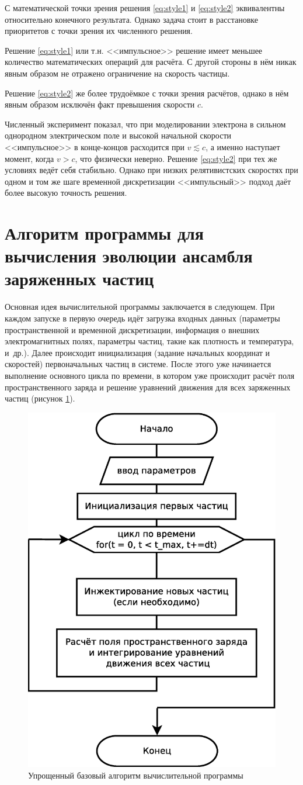 С математической точки зрения решения \eqref{eq:style1} и \eqref{eq:style2} эквивалентны относительно конечного результата. Однако задача стоит в расстановке приоритетов с точки зрения их численного решения. 

Решение \eqref{eq:style1} или т.н. <<импульсное>> решение имеет меньшее количество математических операций для расчёта. С другой стороны в нём никак явным образом не отражено ограничение на скорость частицы.

Решение \eqref{eq:style2} же более трудоёмкое с точки зрения расчётов, однако в нём явным образом исключён факт превышения скорости $c$.

Численный эксперимент показал, что при моделировании электрона в сильном однородном электрическом поле и высокой начальной скорости <<импульсное>> в конце-концов расходится при $v \lesssim c$, а именно наступает момент, когда $v>c$, что физически неверно. Решение \eqref{eq:style2} при тех же условиях ведёт себя стабильно. Однако при низких релятивистских скоростях при одном и том же шаге временной дискретизации <<импульсный>> подход даёт более высокую точность решения.


\section{Алгоритм программы для вычисления эволюции ансамбля заряженных частиц}

Основная идея вычислительной программы заключается в следующем. При каждом запуске в первую очередь идёт загрузка входных данных (параметры пространственной и временной дискретизации, информация о внешних электромагнитных полях, параметры частиц, такие как плотность и температура, и~др.). Далее происходит инициализация (задание начальных координат и скоростей) первоначальных частиц в системе. После этого уже начинается выполнение основного цикла по времени, в котором уже происходит расчёт поля пространственного заряда и решение уравнений движения для всех заряженных частиц (рисунок \ref{fig:Diagram1}). 

\begin{figure}[h!]
\centering
\includegraphics[width=0.5\linewidth]{./fig/ch3/Diagram1}
\caption{Упрощенный базовый алгоритм вычислительной программы}
\label{fig:Diagram1}
\end{figure}

